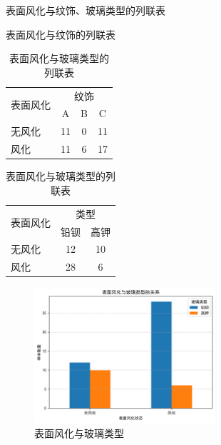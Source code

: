 \documentclass[withoutpreface,bwprint]{cumcmthesis}
\begin{document}
\begin{table}[htbp]
    \centering
    \caption{表面风化与纹饰、玻璃类型的列联表} %
    \begin{subtable}[t]{0.45\textwidth}
        \centering
        \caption{表面风化与纹饰的列联表}
        \begin{tabular}{lccc}
            \toprule
            \multirow{2}{*}{表面风化} & \multicolumn{3}{c}{纹饰} \\
            \cmidrule(lr){2-4}
            & A & B & C \\
            \midrule
            无风化 & 11 & 0 & 11 \\
            风化 & 11 & 6 & 17 \\
            \bottomrule
        \end{tabular}
    \end{subtable}
    \hspace{-15mm}%
    \begin{subtable}[t]{0.45\textwidth}
        \centering
        \caption{表面风化与玻璃类型的列联表}
        \begin{tabular}{lcc}
            \toprule
            \multirow{2}{*}{表面风化} & \multicolumn{2}{c}{类型} \\
            \cmidrule(lr){2-3}
            & 铅钡 & 高钾 \\
            \midrule
            无风化 & 12 & 10 \\
            风化 & 28 & 6 \\
            \bottomrule
        \end{tabular}
    \end{subtable}
\end{table}

\begin{figure}[H]
\centering
\includegraphics[width=0.6\textwidth]{figures/1.1/1-1.png}
\caption{表面风化与玻璃类型}
\label{fig:表面风化与玻璃类型}
\end{figure}
\end{document}
